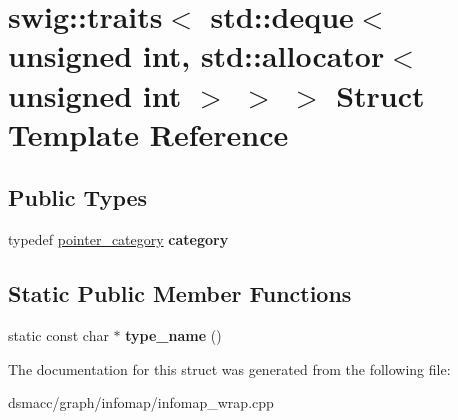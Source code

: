 \hypertarget{structswig_1_1traits_3_01std_1_1deque_3_01unsigned_01int_00_01std_1_1allocator_3_01unsigned_01int_01_4_01_4_01_4}{}\section{swig\+:\+:traits$<$ std\+:\+:deque$<$ unsigned int, std\+:\+:allocator$<$ unsigned int $>$ $>$ $>$ Struct Template Reference}
\label{structswig_1_1traits_3_01std_1_1deque_3_01unsigned_01int_00_01std_1_1allocator_3_01unsigned_01int_01_4_01_4_01_4}
\subsection*{Public Types}
\begin{DoxyCompactItemize}
\item 
\mbox{\label{structswig_1_1traits_3_01std_1_1deque_3_01unsigned_01int_00_01std_1_1allocator_3_01unsigned_01int_01_4_01_4_01_4_a26cd95998379401b63393b18eac11f96}} 
typedef \mbox{\hyperlink{structswig_1_1pointer__category}{pointer\+\_\+category}} {\bfseries category}
\end{DoxyCompactItemize}
\subsection*{Static Public Member Functions}
\begin{DoxyCompactItemize}
\item 
\mbox{\label{structswig_1_1traits_3_01std_1_1deque_3_01unsigned_01int_00_01std_1_1allocator_3_01unsigned_01int_01_4_01_4_01_4_a8723f70d5df1d2f2b40a256b2e4478bf}} 
static const char $\ast$ {\bfseries type\+\_\+name} ()
\end{DoxyCompactItemize}


The documentation for this struct was generated from the following file\+:\begin{DoxyCompactItemize}
\item 
dsmacc/graph/infomap/infomap\+\_\+wrap.\+cpp\end{DoxyCompactItemize}
